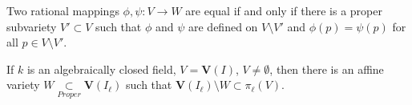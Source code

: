 \documentclass[crop=false,class=article,oneside]{standalone}
\begin{document}
            \begin{theorem}
                Two rational mappings $\phi,\psi:V\rightarrow W$
                are equal if and only if there is a proper subvariety
                $V'\subset V$ such that $\phi$ and $\psi$ are
                defined on $V\setminus V'$ and $\phi(p)=\psi(p)$ for
                all $p\in{V}\setminus{V'}$.
            \end{theorem}
            \begin{theorem}
                If $k$ is an algebraically closed field,
                $V=\mathbf{V}(I)$, $V\ne\emptyset$, then there
                is an affine variety
                $W\underset{Proper}\subset\mathbf{V}(I_{\ell})$
                such that
                $\mathbf{V}(I_{\ell})\setminus%
                 W\subset\pi_{\ell}(V)$.
            \end{theorem}
\end{document}
